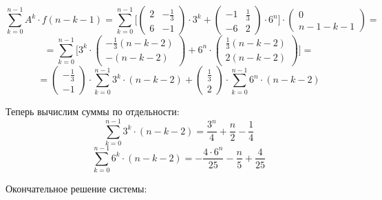 \begin{displaymath}
\sum_{k=0}^{n-1} A^k \cdot f(n-k-1) = \sum_{k=0}^{n-1} \Big [ \begin{pmatrix}
2 & - \frac{1}{3}
\\
6 & -1

\end{pmatrix} \cdot 3^k + \begin{pmatrix}
-1 & \frac{1}{3}
\\
-6 & 2
\end{pmatrix} \cdot 6^n \Big ] \cdot \begin{pmatrix}
0
\\
n-1-k-1
\end{pmatrix} = 
\end{displaymath}
\begin{displaymath}
= \sum_{k=0}^{n-1} \Big [ 3^k \cdot \begin{pmatrix}
- \frac{1}{3} (n-k-2)
\\
- (n-k-2)
\end{pmatrix} + 6^n \cdot \begin{pmatrix}
\frac{1}{3} (n-k-2)
\\
2 (n-k-2)
\end{pmatrix} \Big ] = 
\end{displaymath}
\begin{displaymath}
= \begin{pmatrix}
- \frac{1}{3}
\\
- 1
\end{pmatrix} \cdot \sum_{k=0}^{n-1} 3^k \cdot (n-k-2)  + \begin{pmatrix}
\frac{1}{3}
\\
2 
\end{pmatrix} \cdot  \sum_{k=0}^{n-1} 6^n \cdot (n-k-2)
\end{displaymath}

Теперь вычислим суммы по отдельности:
\begin{displaymath}
\sum_{k=0}^{n-1} 3^k \cdot (n-k-2) = \frac{3^n}{4} + \frac{n}{2} - \frac{1}{4}
\end{displaymath}
\begin{displaymath}
\sum_{k=0}^{n-1} 6^k \cdot (n-k-2) = -\frac{4 \cdot 6^n}{25} - \frac{n}{5} + \frac{4}{25}
\end{displaymath}

Окончательное решение системы:

